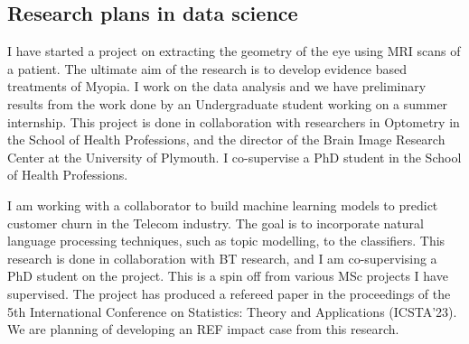 \subsection{Research plans in data science}

I have started a project on extracting the geometry of the eye using
MRI scans of a patient. The ultimate aim of the research is to develop
evidence based treatments of Myopia. I work on the data analysis and
we have preliminary results from the work done by an Undergraduate
student working on a summer internship.  This project is done in
collaboration with researchers in Optometry in the School of Health
Professions, and the director of the Brain Image Research Center at
the University of Plymouth. I co-supervise a PhD student in the
School of Health Professions.


I am working with a collaborator to build machine learning models to
predict customer churn in the Telecom industry.  The goal is to
incorporate natural language processing techniques, such as topic
modelling, to the classifiers.  This research is done in collaboration
with BT research, and I am co-supervising a PhD student on the
project.  This is a spin off from various MSc projects I have
supervised.  The project has produced a refereed paper in the
proceedings of the 5th International Conference on Statistics: Theory
and Applications (ICSTA’23). We are planning of developing an
REF impact case from this research.
